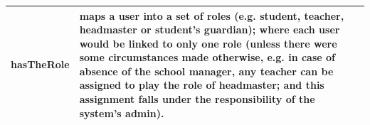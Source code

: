 \begin{table}[bth]
\begin{tabular}{p{0.9 in} p{5.9 in}}
hasTheRole & maps a user into a set of roles (e.g. student, teacher, headmaster or student's guardian); where each user would be linked to only one role (unless there were some circumstances made otherwise, e.g. in case of absence of the school manager, any teacher can be assigned to play the role of headmaster; and this assignment falls under the responsibility of the system’s admin).

\\ \hline\hline
\end{tabular}
\label{tab:relations}
\end{table}








